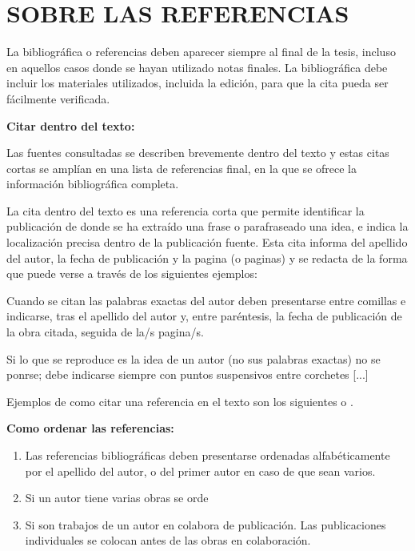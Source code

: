 {{		\section{SOBRE LAS REFERENCIAS}
		
		La bibliográfica o referencias deben aparecer siempre al final de la tesis, incluso en aquellos casos donde se hayan utilizado notas finales. La bibliográfica debe incluir los materiales utilizados, incluida la edición, para que la cita pueda ser fácilmente verificada. 
		
		\bigskip
		{\bf Citar dentro del texto:}
		
		Las fuentes consultadas se describen brevemente dentro del texto y estas citas cortas se amplían en una lista de referencias final, en la que se ofrece la información bibliográfica completa. 
		
		La cita dentro del texto es una referencia corta que permite identificar la publicación de donde se ha extraído una frase o parafraseado una idea, e indica la localización precisa dentro de la publicación fuente. Esta cita informa del apellido del autor, la fecha de publicación y la pagina (o paginas) y se redacta de la forma que puede verse a través de los siguientes ejemplos:
		
		Cuando se citan las palabras exactas del autor deben presentarse entre comillas e indicarse, tras el apellido del autor y, entre paréntesis, la fecha de publicación de la obra citada, seguida de la/s pagina/s.
		
		Si lo que se reproduce es la idea de un autor (no sus palabras exactas) no se ponrse; debe indicarse siempre con puntos suspensivos entre corchetes [...]
		
		Ejemplos de como citar una referencia en el texto son los siguientes \cite{Ashtiani2014} o \cite{Ashtiani2014,Mateos2009,Vicente2016}.
		
		
		\bigskip
		{\bf Como ordenar las referencias:}
		\begin{enumerate}
			\item Las referencias bibliográficas deben presentarse ordenadas alfabéticamente por el apellido del autor, o del primer autor en caso de que sean varios.
			\item Si un autor tiene varias obras se orde
			\item Si son trabajos de un autor en colabora de publicación. Las publicaciones individuales se colocan antes de las obras en colaboración.
		\end{enumerate}
		
}}
